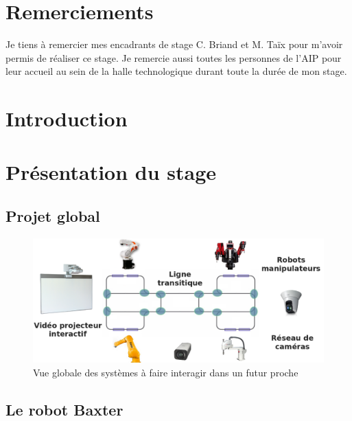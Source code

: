 \documentclass[a4paper,french, titlepage]{article}
\begin{document}
\newpage
{}
\section*{Remerciements}

\vspace{5cm}

Je tiens à remercier mes encadrants de stage C. Briand et M. Taïx pour m'avoir permis de réaliser ce stage. Je remercie aussi toutes les personnes de l'AIP pour leur accueil au sein de la halle technologique durant toute la durée de mon stage.

\newpage
\renewcommand{\contentsname}{Sommaire} %
\tableofcontents %


\newpage
{}
\section*{Introduction}


\newpage
\section{Présentation du stage}

\subsection{Projet global}

\begin{figure}[H] 
\begin{center}
\includegraphics[scale=0.35]{Images/projet_global.png} 
\end{center}
\caption{Vue globale des systèmes à faire interagir dans un futur proche}
\label{projet_global}
\end{figure} 

\subsection{Le robot Baxter}
\end{document}
